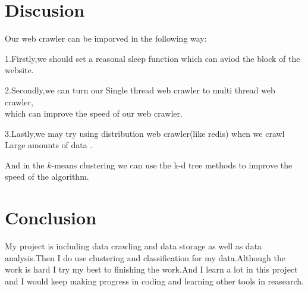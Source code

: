 \documentclass[12pt, a4paper]{article}
\begin{document}
\newpage   
\section{Discusion}
Our web crawler can be imporved in the following way:

1.Firstly,we should set a reasonal  sleep function which can aviod the block of the website. 

2.Secondly,we can turn our Single thread web 
crawler to multi thread web crawler,\\which can 
improve the speed of our web crawler.

3.Lastly,we may try using distribution web crawler(like redis) when
we crawl Large amounts of data .

And in the $k$-means clustering we can use the k-d tree methods to 
improve the speed of the algorithm.

\section{Conclusion}
My project is including data crawling and data storage as well as data 
analysis.Then I do use clustering and classification for my data.Although 
the work is hard I try my best to finishing the work.And I learn 
a lot in this project and I would keep making progress in coding
and learning other tools in reasearch. 









\newpage





\end{document}

